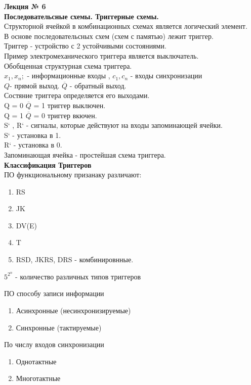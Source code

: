 \LARGE{ \textbf {Лекция № 6}}\\
\Large{ \textbf { Последовательсные схемы.
Триггерные схемы.}} \\

Структорной ячейкой в комбинационных схемах является логический элемент.\\
В основе последовательсных схем (схем с памятью) лежит триггер.\\
Триггер - устройство с 2 устойчивыми состояниями.\\
Пример электромеханического триггера является выключатель.\\

Обобщенная структурная схема триггера.\\
$x_1, x_n ;$ - информационные входы , $c_1, c_n$ - входы синхронизации\\
$Q$- прямой выход. $\overline{Q}$ - обратный выход.\\
Состяние триггера определяется его выходами.\\
Q = 0  $\overline{Q}$ = 1 триггер выключен.\\
Q = 1  $\overline{Q}$ = 0 триггер вкючен.\\
S` , R`  - сигналы, которые действуют на входы запоминающей ячейки.\\
S` - установка в 1.\\
R` - установка в 0.\\
Запоминающая ячейка - простейшая схема триггера.\\


\Large{ \textbf { Классификация Триггеров }} \\
ПО функциональному призанаку различают:
\begin{enumerate}
  \item RS
  \item JK
  \item DV(E)
  \item T
  \item RSD, JKRS, DRS - комбинировнные.
\end{enumerate}
$5^{2^n}$ - количество различных типов триггеров

ПО способу записи информации\\
\begin{enumerate}
  \item Асинхронные (несинхронизируемые)
  \item Синхронные (тактируемые)
\end{enumerate}

По числу входов синхронизации
\begin{enumerate}
  \item Однотактные
  \item Многотактные
\end{enumerate}

